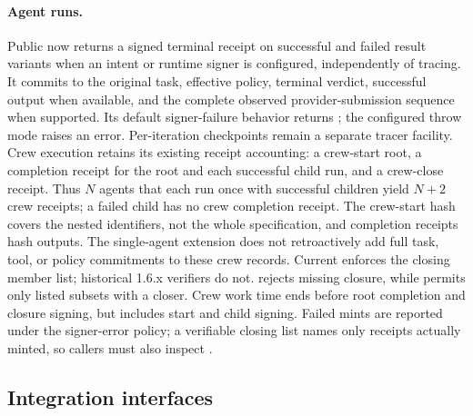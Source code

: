\paragraph{Agent runs.} Public  now returns a signed terminal receipt on successful and failed result variants when an intent or runtime signer is configured, independently of tracing. It commits to the original task, effective policy, terminal verdict, successful output when available, and the complete observed provider-submission sequence when supported. Its default signer-failure behavior returns ; the configured throw mode raises an error. Per-iteration checkpoints remain a separate tracer facility. Crew execution retains its existing receipt accounting: a crew-start root, a completion receipt for the root and each successful child run, and a crew-close receipt. Thus $N$ agents that each run once with successful children yield $N+2$ crew receipts; a failed child has no crew completion receipt. The crew-start hash covers the nested identifiers, not the whole specification, and completion receipts hash outputs. The single-agent extension does not retroactively add full task, tool, or policy commitments to these crew records. Current  enforces the closing member list; historical 1.6.x verifiers do not.  rejects missing closure, while  permits only listed subsets with a closer. Crew work time ends before root completion and closure signing, but includes start and child signing. Failed mints are reported under the signer-error policy; a verifiable closing list names only receipts actually minted, so callers must also inspect .

\subsection{Integration interfaces}\label{app:integration-details}

